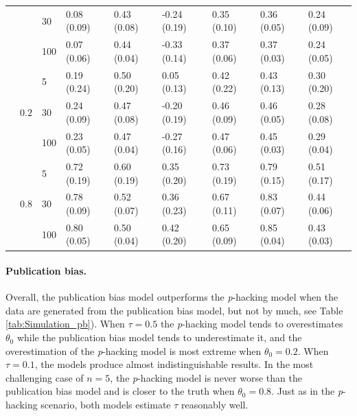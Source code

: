 \documentclass{article}
\theoremstyle{plain}
\theoremstyle{definition}
\begin{document}
\begin{table}[ht]
\begin{tabular}{lllllllll}
   &  & 30 & 0.08 (0.09) & 0.43 (0.08) & -0.24 (0.19) & 0.35 (0.10) & 0.36 (0.05) & 0.24 (0.09) \\ 
   &  & 100 & 0.07 (0.06) & 0.44 (0.04) & -0.33 (0.14) & 0.37 (0.06) & 0.37 (0.03) & 0.24 (0.05) \\ 
   & \multirow{3}{*}{$0.2$} & 5 & 0.19 (0.24) & 0.50 (0.20) & 0.05 (0.13) & 0.42 (0.22) & 0.43 (0.13) & 0.30 (0.20) \\ 
   &  & 30 & 0.24 (0.09) & 0.47 (0.08) & -0.20 (0.19) & 0.46 (0.09) & 0.46 (0.05) & 0.28 (0.08) \\ 
   &  & 100 & 0.23 (0.05) & 0.47 (0.04) & -0.27 (0.16) & 0.47 (0.06) & 0.45 (0.03) & 0.29 (0.04) \\ 
   & \multirow{3}{*}{$0.8$} & 5 & 0.72 (0.19) & 0.60 (0.19) & 0.35 (0.20) & 0.73 (0.19) & 0.79 (0.15) & 0.51 (0.17) \\ 
   &  & 30 & 0.78 (0.09) & 0.52 (0.07) & 0.36 (0.23) & 0.67 (0.11) & 0.83 (0.07) & 0.44 (0.06) \\ 
   &  & 100 & 0.80 (0.05) & 0.50 (0.04) & 0.42 (0.20) & 0.65 (0.09) & 0.85 (0.04) & 0.43 (0.03) \\ 
   \hline
\end{tabular}
\end{table}

\paragraph{Publication bias.} 
Overall, the publication bias model outperforms the \textit{p}-hacking model when the data are generated from the publication bias model, but not by much, see Table \ref{tab:Simulation_pb}). When $\tau = 0.5$ the \textit{p}-hacking model tends to overestimates $\theta_0$ while the publication bias model tends to underestimate it, and the overestimation of the \textit{p}-hacking model is most extreme when $\theta_0 = 0.2$. When $\tau = 0.1$, the models produce almost indistinguishable results. In the most challenging case of $n=5$, the \textit{p}-hacking model is never worse than the publication bias model and is closer to the truth when $\theta_0 = 0.8$. Just as in the \textit{p}-hacking scenario, both models estimate $\tau$ reasonably well.
\end{document}

